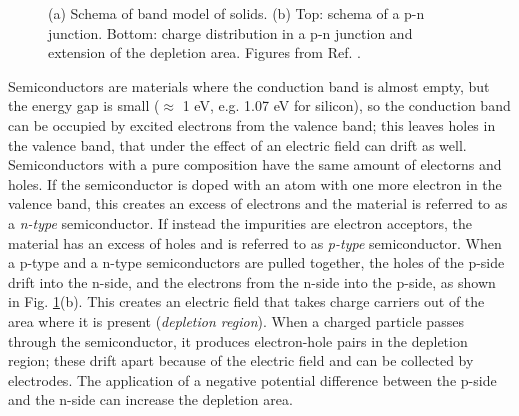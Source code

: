 \begin{figure}[ht]
\centering
{}
\caption{(a) Schema of band model of solids. (b) Top: schema of a p-n junction. Bottom: charge distribution in a p-n junction and extension of the depletion area. Figures from Ref. \cite{grupen_shwartz_2008}.}
\label{fig:det:band}
\end{figure}

Semiconductors are materials where the conduction band is almost empty, but the energy gap is small ($\approx$ 1 eV, e.g. 1.07 eV for silicon), so the conduction band can be occupied by excited electrons from the valence band; this leaves holes in the valence band, that under the effect of an electric field can drift as well. Semiconductors with a pure composition have the same amount of electorns and holes. If the semiconductor is doped with an atom with one more electron in the valence band, this creates an excess of electrons and the material is referred to as a \textit{n-type} semiconductor. If instead the impurities are electron acceptors, the material has an excess of holes and is referred to as \textit{p-type} semiconductor. When a p-type and a n-type semiconductors are pulled together, the holes of the p-side drift into the n-side, and the electrons from the n-side into the p-side, as shown in Fig. \ref{fig:det:band}(b). This creates an electric field that takes charge carriers out of the area where it is present (\textit{depletion region}). When a charged particle passes through the semiconductor, it produces electron-hole pairs in the depletion region; these drift apart because of the electric field and can be collected by electrodes. The application of a negative potential difference between the p-side and the n-side can increase the depletion area.


